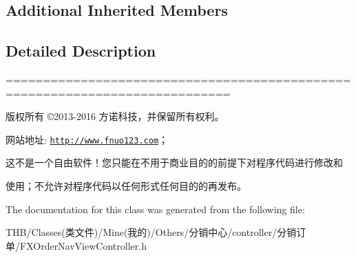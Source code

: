 \subsection*{Additional Inherited Members}


\subsection{Detailed Description}
============================================================================

版权所有 ©2013-\/2016 方诺科技，并保留所有权利。

网站地址\+: \href{http://www.fnuo123.com}{\tt http\+://www.\+fnuo123.\+com}； 



这不是一个自由软件！您只能在不用于商业目的的前提下对程序代码进行修改和

使用；不允许对程序代码以任何形式任何目的的再发布。 

 

The documentation for this class was generated from the following file\+:\begin{DoxyCompactItemize}
\item 
T\+H\+B/\+Classes(类文件)/\+Mine(我的)/\+Others/分销中心/controller/分销订单/F\+X\+Order\+Nav\+View\+Controller.\+h\end{DoxyCompactItemize}
